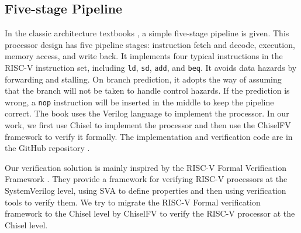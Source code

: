 \documentclass[conference]{IEEEtran}
\theoremstyle{definition}
\begin{document}
\subsection{Five-stage Pipeline}
In the classic architecture textbooks \cite{patterson2017computer}, a simple five-stage pipeline is given. 
This processor design has five pipeline stages: instruction fetch and decode, execution, memory access, and write back. 
It implements four typical instructions in the RISC-V instruction set, including \verb|ld|, \verb|sd|, \verb|add|, and \verb|beq|.
It avoids data hazards by forwarding and stalling. On branch prediction, it adopts the way of assuming that the branch will not be taken to handle control hazards. If the prediction is wrong, a \verb|nop| instruction will be inserted in the middle to keep the pipeline correct.
The book uses the Verilog language to implement the processor. In our work, we first use Chisel to implement the processor and then use the ChiselFV framework to verify it formally. The implementation and verification code are in the GitHub repository \cite{riscvFvChisel}.

Our verification solution is mainly inspired by the RISC-V Formal Verification Framework \cite{riscv-formal}. They provide a framework for verifying RISC-V processors at the SystemVerilog level, using SVA to define properties and then using verification tools to verify them.
We try to migrate the RISC-V Formal verification framework to the Chisel level by ChiselFV to verify the RISC-V processor at the Chisel level.
\end{document}
